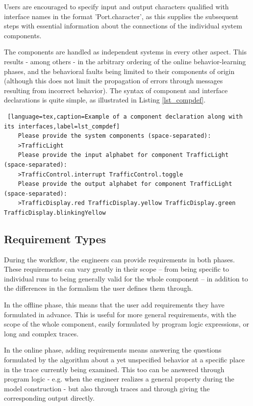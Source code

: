 Users are encouraged to specify input and output characters qualified with interface names in the format '{\selectfont Port.character}', as this supplies the subsequent steps with essential information about the connections of the individual system components.

The components are handled as independent systems in every other aspect. This results - among others - in the arbitrary ordering of the online behavior-learning phases, and the behavioral faults being limited to their components of origin (although this does not limit the propagation of errors through messages resulting from incorrect behavior).
The syntax of component and interface declarations is quite simple, as illustrated in Listing \ref{lst_compdef}.

\bigskip
\begin{lstlisting} [language=tex,caption=Example of a component declaration along with its interfaces,label=lst_compdef]
	Please provide the system components (space-separated):
	>TrafficLight
	Please provide the input alphabet for component TrafficLight (space-separated):
	>TrafficControl.interrupt TrafficControl.toggle
	Please provide the output alphabet for component TrafficLight (space-separated):
	>TrafficDisplay.red TrafficDisplay.yellow TrafficDisplay.green TrafficDisplay.blinkingYellow
\end{lstlisting}

\subsection{Requirement Types} \label{subs_reqtypes}
During the workflow, the engineers can provide requirements in both phases. These requirements can vary greatly in their scope -- from being specific to individual runs to being generally valid for the whole component -- in addition to the differences in the formalism the user defines them through. 

In the offline phase, this means that the user add requirements they have formulated in advance. This is useful for more general requirements, with the scope of the whole component, easily formulated by program logic expressions, or long and complex traces.

In the online phase, adding requirements means answering the questions formulated by the algorithm about a yet unspecified behavior at a specific place in the trace currently being examined. This too can be answered through program logic - e.g. when the engineer realizes a general property during the model construction - but also through traces and through giving the corresponding output directly.

